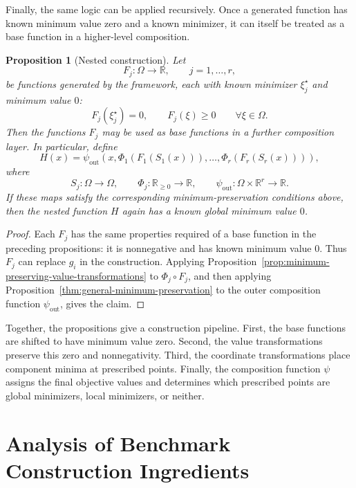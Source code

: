 \documentclass[journal]{IEEEtran}
\theoremstyle{remark}
\theoremstyle{plain}
\newtheorem{proposition}{Proposition}
\begin{document}
Finally, the same logic can be applied recursively. Once a generated function
has known minimum value zero and a known minimizer, it can itself be treated as
a base function in a higher-level composition.

\begin{proposition}[Nested construction]
	\label{prop:nested-construction}
	Let
	\[
	F_j:\Omega\to\mathbb{R},
	\qquad j=1,\ldots,r,
	\]
	be functions generated by the framework, each with known minimizer
	\(\xi_j^\star\) and minimum value \(0\):
	\[
	F_j(\xi_j^\star)=0,
	\qquad
	F_j(\xi)\ge0
	\qquad
	\forall \xi\in\Omega.
	\]
	Then the functions \(F_j\) may be used as base functions in a further
	composition layer. In particular, define
	\[
	H(x)
	=
	\psi_{\mathrm{out}}
	\left(
	x,
	\Phi_1(F_1(S_1(x))),
	\ldots,
	\Phi_r(F_r(S_r(x)))
	\right),
	\]
	where
	\[
	S_j:\Omega\to\Omega,
	\qquad
	\Phi_j:\mathbb{R}_{\ge0}\to\mathbb{R},
	\qquad
	\psi_{\mathrm{out}}:\Omega\times\mathbb{R}^r\to\mathbb{R}.
	\]
	If these maps satisfy the corresponding minimum-preservation conditions
	above, then the nested function \(H\) again has a known global minimum value
	\(0\).
\end{proposition}

\begin{proof}
	Each \(F_j\) has the same properties required of a base function in the
	preceding propositions: it is nonnegative and has known minimum value \(0\).
	Thus \(F_j\) can replace \(g_i\) in the construction. Applying
	Proposition~\ref{prop:minimum-preserving-value-transformations} to
	\(\Phi_j\circ F_j\), and then applying
	Proposition~\ref{thm:general-minimum-preservation} to the outer composition
	function \(\psi_{\mathrm{out}}\), gives the claim.
\end{proof}


Together, the propositions give a construction pipeline. First, the base
functions are shifted to have minimum value zero. Second, the value
transformations preserve this zero and nonnegativity. Third, the coordinate
transformations place component minima at prescribed points. Finally, the
composition function \(\psi\) assigns the final objective values and determines
which prescribed points are global minimizers, local minimizers, or neither.



\section{Analysis of Benchmark Construction Ingredients}
\label{sec:anaylsis of benchmark construction}
\end{document}
